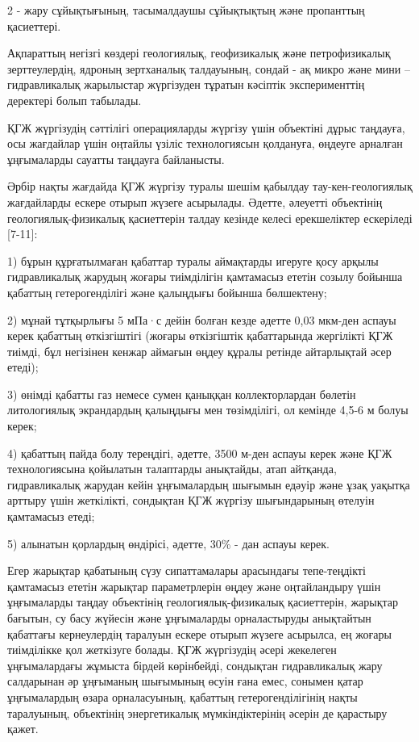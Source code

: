 \begin{multicols}{2}
- жару сұйықтығының, тасымалдаушы сұйықтықтың және пропанттың
қасиеттері.

Ақпараттың негізгі көздері геологиялық, геофизикалық және петрофизикалық
зерттеулердің, ядроның зертханалық талдауының, сондай - ақ микро және
мини -- гидравликалық жарылыстар жүргізуден тұратын кәсіптік
эксперименттің деректері болып табылады.

ҚГЖ жүргізудің сәттілігі операцияларды жүргізу үшін объектіні дұрыс
таңдауға, осы жағдайлар үшін оңтайлы үзіліс технологиясын қолдануға,
өңдеуге арналған ұңғымаларды сауатты таңдауға байланысты.

Әрбір нақты жағдайда ҚГЖ жүргізу туралы шешім қабылдау
тау-кен-геологиялық жағдайларды ескере отырып жүзеге асырылады. Әдетте,
әлеуетті объектінің геологиялық-физикалық қасиеттерін талдау кезінде
келесі ерекшеліктер ескеріледі {[}7-11{]}:

1) бұрын құрғатылмаған қабаттар туралы аймақтарды игеруге қосу арқылы
гидравликалық жарудың жоғары тиімділігін қамтамасыз ететін созылу
бойынша қабаттың гетерогенділігі және қалыңдығы бойынша бөлшектену;

2) мұнай тұтқырлығы 5 мПа·с дейін болған кезде әдетте 0,03
мкм-ден аспауы керек қабаттың өткізгіштігі (жоғары
өткізгіштік қабаттарында жергілікті ҚГЖ тиімді, бұл негізінен кенжар
аймағын өңдеу құралы ретінде айтарлықтай әсер етеді);

3) өнімді қабатты газ немесе сумен қаныққан коллекторлардан бөлетін
литологиялық экрандардың қалыңдығы мен төзімділігі, ол кемінде 4,5-6 м
болуы керек;

4) қабаттың пайда болу тереңдігі, әдетте, 3500 м-ден аспауы керек және
ҚГЖ технологиясына қойылатын талаптарды анықтайды, атап айтқанда,
гидравликалық жарудан кейін ұңғымалардың шығымын едәуір және ұзақ
уақытқа арттыру үшін жеткілікті, сондықтан ҚГЖ жүргізу шығындарының
өтелуін қамтамасыз етеді;

5) алынатын қорлардың өндірісі, әдетте, 30\% - дан аспауы керек.

Егер жарықтар қабатының сүзу сипаттамалары арасындағы тепе-теңдікті
қамтамасыз ететін жарықтар параметрлерін өңдеу және оңтайландыру үшін
ұңғымаларды таңдау объектінің геологиялық-физикалық қасиеттерін,
жарықтар бағытын, су басу жүйесін және ұңғымаларды орналастыруды
анықтайтын қабаттағы кернеулердің таралуын ескере отырып жүзеге
асырылса, ең жоғары тиімділікке қол жеткізуге болады. ҚГЖ жүргізудің
әсері жекелеген ұңғымалардағы жұмыста бірдей көрінбейді, сондықтан
гидравликалық жару салдарынан әр ұңғыманың шығымының өсуін ғана емес,
сонымен қатар ұңғымалардың өзара орналасуының, қабаттың
гетерогенділігінің нақты таралуының, объектінің энергетикалық
мүмкіндіктерінің әсерін де қарастыру қажет.


\end{multicols}
